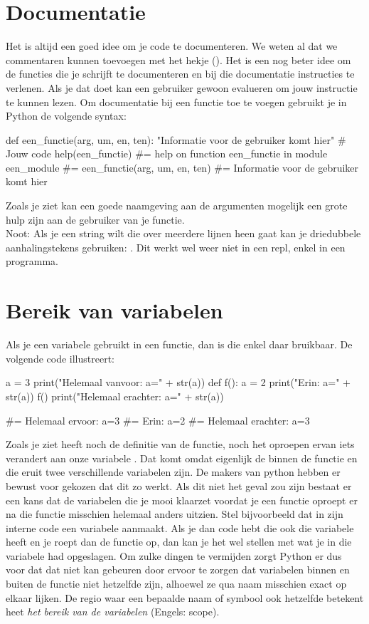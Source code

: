 \section{Documentatie}
  Het is altijd een goed idee om je code te documenteren. We weten al dat we
  commentaren kunnen toevoegen met het hekje (\py{\#}). Het is een nog beter
  idee om de functies die je schrijft te documenteren en bij die documentatie
  instructies te verlenen. Als je dat doet kan een gebruiker gewoon
   evalueren om jouw instructie te kunnen lezen. Om
  documentatie bij een functie toe te voegen gebruikt je in Python de volgende
  syntax:
  \begin{python}
    def een_functie(arg, um, en, ten):
      "Informatie voor de gebruiker komt hier"
      # Jouw code
    help(een_functie)
    #= help on function een_functie in module een_module
    #= een_functie(arg, um, en, ten)
    #=     Informatie voor de gebruiker komt hier
  \end{python}
  Zoals je ziet kan een goede naamgeving aan de argumenten mogelijk een grote
  hulp zijn aan de gebruiker van je functie.\\
  Noot: Als je een string wilt die over meerdere lijnen heen gaat kan je
  driedubbele aanhalingstekens gebruiken: .
  Dit werkt wel weer niet in een repl, enkel
  in een programma.
\section{Bereik van variabelen}
  Als je een variabele gebruikt in een functie, dan is die enkel daar bruikbaar.
  De volgende code illustreert:
  \begin{python}
    a = 3
    print("Helemaal vanvoor: a=" + str(a))
    def f():
      a = 2
      print("Erin: a=" + str(a))
    f()
    print("Helemaal erachter: a=" + str(a))

    #= Helemaal ervoor: a=3
    #= Erin: a=2
    #= Helemaal erachter: a=3
  \end{python}
  Zoals je ziet heeft noch de definitie van de functie, noch het oproepen ervan
  iets verandert aan onze variabele . Dat komt omdat eigenlijk de 
  binnen de functie en die eruit twee verschillende variabelen zijn. De makers
  van python hebben er bewust voor gekozen dat dit zo werkt. Als dit niet het
  geval zou zijn bestaat er een kans dat de variabelen die je mooi klaarzet
  voordat je een functie oproept er na die functie misschien helemaal anders
  uitzien. Stel bijvoorbeeld dat  in zijn interne code een variabele
   aanmaakt. Als je dan code hebt die ook die variabele  heeft
  en je roept dan de functie op, dan kan je het wel stellen met wat je
  in die variabele had opgeslagen. Om zulke dingen te vermijden zorgt Python er
  dus voor dat dat niet kan gebeuren door ervoor te zorgen dat variabelen binnen
  en buiten de functie niet hetzelfde zijn, alhoewel ze qua naam misschien exact
  op elkaar lijken. De regio waar een bepaalde naam of symbool ook hetzelfde
  betekent heet \emph{het bereik van de variabelen} (Engels: scope).
